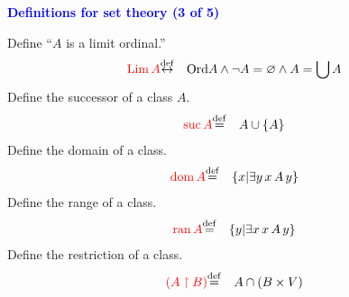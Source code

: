 \documentclass{slides}
\begin{document}
\begin{slide}

\begin{center}
\textcolor{blue}{\textbf{Definitions for set theory (3 of 5)}}
\end{center}

Define ``$A$ is a limit ordinal.''
\begin{eqnarray}
\textcolor{red}{ {\rm Lim}\, A} & {\buildrel\rm def\over \leftrightarrow} &
 {\rm Ord} A \wedge \lnot A = \varnothing
\wedge A = \bigcup A  \label{df-lim}
\end{eqnarray}
Define the successor of a class $A$.
\begin{eqnarray}
\textcolor{red}{{\rm suc}\, A} & {\buildrel\rm def\over =} &
  A \cup \{ A \}  \label{df-suc}
\end{eqnarray}
Define the domain of a class.
\begin{eqnarray}
\textcolor{red}{{\rm dom}\, A} & {\buildrel\rm def\over =} &
  \{ x | \exists y \,x \,A \,y \} \label{df-dm}
\end{eqnarray}
Define the range of a class.
\begin{eqnarray}
\textcolor{red}{{\rm ran}\, A} & {\buildrel\rm def\over =} &  \{ y | \exists x
 \,x \,A \,y \}  \label{dfrn2}
\end{eqnarray}
Define the restriction of a class.
\begin{eqnarray}
\textcolor{red}{( A \restriction B )} & {\buildrel\rm def\over =} &
   A \cap ( B \times V )   \label{df-res}
\end{eqnarray}

\end{slide}
\end{document}
